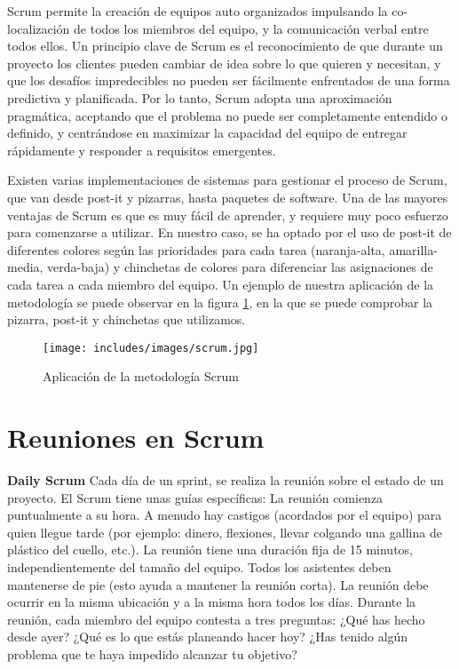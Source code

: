 Scrum permite la creación de equipos auto organizados impulsando la co-localización de todos los miembros del equipo, y la comunicación verbal entre todos ellos.
Un principio clave de Scrum es el reconocimiento de que durante un proyecto los clientes pueden cambiar de idea sobre lo que quieren y necesitan, y que los desafíos impredecibles no pueden ser fácilmente enfrentados de una forma predictiva y planificada. Por lo tanto, Scrum adopta una aproximación pragmática, aceptando que el problema no puede ser completamente entendido o definido, y centrándose en maximizar la capacidad del equipo de entregar rápidamente y responder a requisitos emergentes.

Existen varias implementaciones de sistemas para gestionar el proceso de Scrum, que van desde post-it y pizarras, hasta paquetes de software. Una de las mayores ventajas de Scrum es que es muy fácil de aprender, y requiere muy poco esfuerzo para comenzarse a utilizar. En nuestro caso, se ha optado por el uso de post-it de diferentes colores según las prioridades para cada tarea (naranja-alta, amarilla-media, verda-baja) y chinchetas de colores para diferenciar las asignaciones de cada tarea a cada miembro del equipo. Un ejemplo de nuestra aplicación de la metodología se puede observar en la figura \ref{fig:scrum}, en la que se puede comprobar la pizarra, post-it y chinchetas que utilizamos.  

\begin{figure}[t]
\begin{center}
\texttt{[image: includes/images/scrum.jpg]}
\caption{Aplicación de la metodología Scrum}
\label{fig:scrum}
\end{center}
\end{figure}

\section{Reuniones en Scrum}
\label{capitulo5:reuniones}
\textbf{Daily Scrum}
Cada día de un sprint, se realiza la reunión sobre el estado de un proyecto. El Scrum tiene unas guías específicas:
La reunión comienza puntualmente a su hora. A menudo hay castigos (acordados por el equipo) para quien llegue tarde (por ejemplo: dinero, flexiones, llevar colgando una gallina de plástico del cuello, etc.).
La reunión tiene una duración fija de 15 minutos, independientemente del tamaño del equipo.
Todos los asistentes deben mantenerse de pie (esto ayuda a mantener la reunión corta).
La reunión debe ocurrir en la misma ubicación y a la misma hora todos los días.
Durante la reunión, cada miembro del equipo contesta a tres preguntas:
¿Qué has hecho desde ayer?
¿Qué es lo que estás planeando hacer hoy?
¿Has tenido algún problema que te haya impedido alcanzar tu objetivo?

